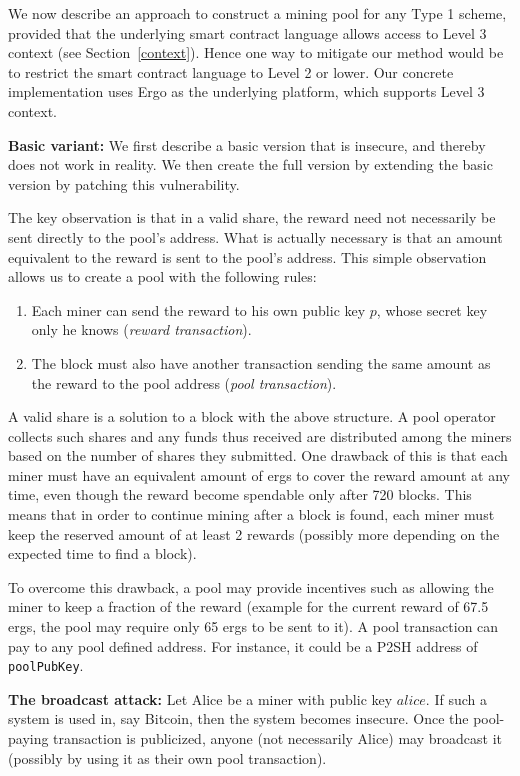 \documentclass[11pt]{article}
\newcommand{\authnote}[2]{\marginpar{\parbox{\marginparwidth}{\tiny %
  \textsf{#1 {\textcolor{blue}{notes: #2}}}}}%
  \textcolor{blue}{\textbf{\dag}}}
\newcommand{\authnote}[2]{
  \textsf{#1 \textcolor{blue}{: #2}}}
\newcommand{\authnote}[2]{}
\newcommand{\snote}[1]{{\authnote{\textcolor{red}{Scalahub notes}}{#1}}}
\begin{document}
We now describe an approach to construct a mining pool for any Type 1 scheme, provided that the underlying smart contract language allows access to Level 3 context (see Section~\ref{context}). Hence one way to mitigate our method would be to restrict the smart contract language to Level 2 or lower. Our concrete implementation uses Ergo as the underlying platform, which supports Level 3 context.

\textbf{Basic variant:} We first describe a basic version that is insecure, and thereby does not work in reality. We then create the full version by extending the basic version by patching this vulnerability.

The key observation is that in a valid share, the reward need not necessarily be sent directly to the pool's address. What is actually necessary is that an amount equivalent to the reward is sent to the pool's address. This simple observation allows us to create a pool with the following rules:
\begin{enumerate}
	\item Each miner can send the reward to his own public key $p$, whose secret key only he knows ({\em reward transaction}).
	\item The block must also have another transaction sending the same amount as the reward to the pool address ({\em pool transaction}).
\end{enumerate}

\snote{Maybe make this section less Ergo-specific}

A valid share is a solution to a block with the above structure. A pool operator collects such shares and any funds thus received are distributed among the miners based on the number of shares they submitted. One drawback of this is that each miner must have an equivalent amount of ergs to cover the reward amount at any time, even though the reward become spendable only after 720 blocks. 
This means that in order to continue mining after a block is found, each miner must keep the reserved amount of at least 2 rewards (possibly more depending on the expected time to find a block).

 To overcome this drawback, a pool may provide incentives such as allowing the miner to keep a fraction of the reward (example for the current reward of 67.5 ergs, the pool may require only 65 ergs to be sent to it). A pool transaction can pay to any pool defined address. For instance, it could be a P2SH address of \texttt{poolPubKey}.


\textbf{The broadcast attack:} Let Alice be a miner with public key $alice$. If such a system is used in, say Bitcoin, then the system becomes insecure. Once the pool-paying transaction is publicized, anyone (not necessarily Alice) may broadcast it (possibly by using it as their own pool transaction). 
\end{document}
